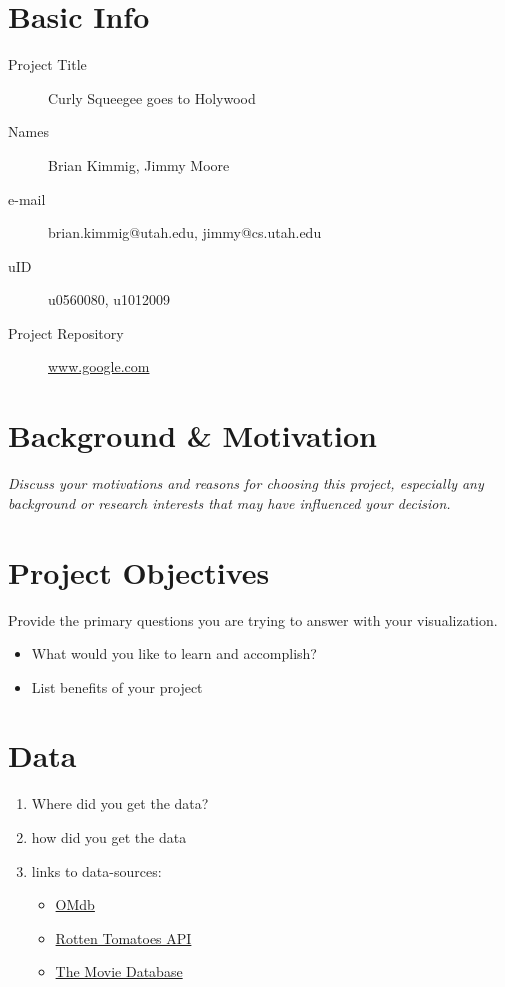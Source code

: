 \documentclass[12pt]{article}
\begin{document}
\section{Basic Info}
\begin{description}
 \item [Project Title]  Curly Squeegee goes to Holywood 
 \item [Names]  Brian Kimmig, Jimmy Moore
 \item[e-mail] brian.kimmig@utah.edu, jimmy@cs.utah.edu
 \item [uID] u0560080, u1012009
 \item [Project Repository] \url{www.google.com}
\end{description}


\section{Background \& Motivation}
\textit{Discuss your motivations and reasons for choosing this project, especially any background or research interests that may have influenced your decision.}

\section{Project Objectives}
Provide the primary questions you are trying to answer with your visualization. 
\begin{itemize}
\item  What would you like to learn and accomplish?
\item  List benefits of your project

\end{itemize}

\section{Data}
\begin{enumerate}
\item Where did you get the data?
\item how did you get the data
\item links to data-sources:
\begin{itemize}
\item \href{www.omdbapi.com}{OMdb}
\item \href{http://developer.rottentomatoes.com/}{Rotten Tomatoes API}
\item \href{https://www.themoviedb.org/documentation/api}{The Movie Database}
\end{itemize}
\end{enumerate}
\end{document}
